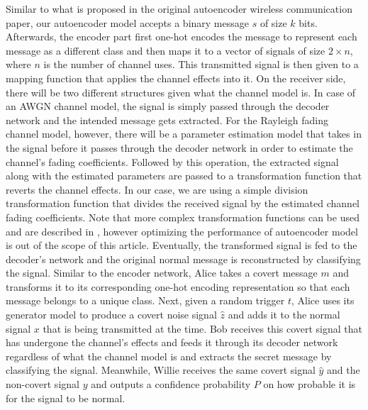Similar to what is proposed in the original autoencoder wireless communication paper, our autoencoder model accepts a binary message \(s\) of size \(k\) bits. Afterwards, the encoder part first one-hot encodes the message to represent each message as a different class and then maps it to a vector of signals of size \(2 \times n\), where \(n\) is the number of channel uses. This transmitted signal is then given to a mapping function that applies the channel effects into it. On the receiver side, there will be two different structures given what the channel model is. In case of an AWGN channel model, the signal is simply passed through the decoder network and the intended message gets extracted. For the Rayleigh fading channel model, however, there will be a parameter estimation model that takes in the signal before it passes through the decoder network in order to estimate the channel's fading coefficients. Followed by this operation, the extracted signal along with the estimated parameters are passed to a transformation function that reverts the channel effects. In our case, we are using a simple division transformation function that divides the received signal by the estimated channel fading coefficients. Note that more complex transformation functions can be used and are described in \cite{o2017introduction}, however optimizing the performance of autoencoder model is out of the scope of this article. Eventually, the transformed signal is fed to the decoder's network and the original normal message is reconstructed by classifying the signal. Similar to the encoder network, Alice takes a covert message \(m\) and transforms it to its corresponding one-hot encoding representation so that each message belongs to a unique class. Next, given a random trigger \(t\), Alice uses its generator model to produce a covert noise signal \(\hat{z}\) and adds it to the normal signal \(x\) that is being transmitted at the time. Bob receives this covert signal that has undergone the channel's effects and feeds it through its decoder network regardless of what the channel model is and extracts the secret message by classifying the signal. Meanwhile, Willie receives the same covert signal \(\hat{y}\) and the non-covert signal \(y\) and outputs a confidence probability \(P\) on how probable it is for the signal to be normal.
